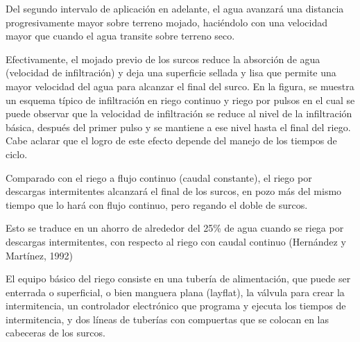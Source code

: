 Del segundo intervalo de aplicación en adelante, el agua avanzará una distancia progresivamente mayor sobre terreno mojado, haciéndolo con una velocidad mayor que cuando el agua transite sobre terreno seco.

Efectivamente, el mojado previo de los surcos reduce la absorción de agua (velocidad de infiltración) y deja una superficie sellada y lisa que permite una mayor velocidad del agua para alcanzar el final del surco.
En la figura, se muestra un esquema típico de infiltración en riego continuo y riego por pulsos en el cual se puede observar que la velocidad de infiltración se reduce al nivel de la infiltración básica, después del primer pulso y se mantiene a ese nivel hasta el final del riego. Cabe aclarar que el logro de este efecto depende del manejo de los tiempos de ciclo.

Comparado con el riego a flujo continuo (caudal constante), el riego por descargas intermitentes alcanzará el final de los surcos, en pozo más del mismo tiempo que lo hará con flujo continuo, pero regando el doble de surcos.

Esto se traduce en un ahorro de alrededor del 25\% de agua cuando se riega por descargas intermitentes, con respecto al riego con caudal continuo (Hernández y Martínez, 1992)

El equipo básico del riego consiste en una tubería de alimentación, que puede ser enterrada o superficial, o bien manguera plana (layflat), la válvula para crear la intermitencia, un controlador electrónico que programa y ejecuta los tiempos de intermitencia, y dos líneas de tuberías con compuertas que se colocan en las cabeceras de los surcos.
















































